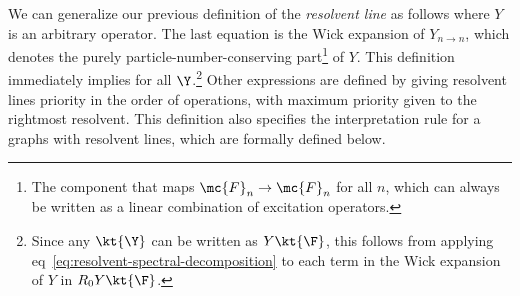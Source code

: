 \begin{dfn}\label{dfn:resolvent-line}
We can generalize our previous definition of the \textit{resolvent line} as follows
where $Y$ is an arbitrary operator.
The last equation is the Wick expansion of $Y_{n\rightarrow n}$, which denotes the purely particle-number-conserving part\footnote{The component that maps $\mc{F}_n\rightarrow\mc{F}_n$ for all $n$, which can always be written as a linear combination of excitation operators.} of $Y$.
This definition immediately implies
for all $\Y$.\footnote{Since any $\kt{\Y}$ can be written as $Y\kt{\F}$, this follows from applying eq~\ref{eq:resolvent-spectral-decomposition} to each term in the Wick expansion of $Y$ in $R_0Y\kt{\F}$.}
Other expressions are defined by giving resolvent lines priority in the order of operations, with maximum priority given to the rightmost resolvent.
This definition also specifies the interpretation rule for a graphs with resolvent lines, which are formally defined below.
\end{dfn}



